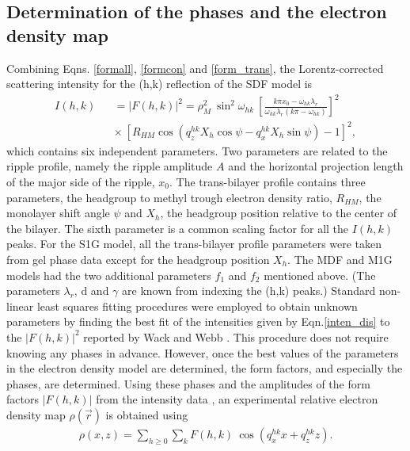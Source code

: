\subsection{Determination of the phases and the electron density map}

Combining Eqns. \ref{formall}, \ref{formcon} and \ref{form_trans}, the 
Lorentz-corrected scattering intensity for the (h,k) reflection of the 
SDF model is
\begin{eqnarray}
\label{inten_dis}
I(h,k) && = |F(h,k)|^2 
= \rho_M^2\ \sin^2 \omega_{hk}\ \left[\frac{k \pi x_0 -
\omega_{hk} \lambda_r}{\omega_{hk} \lambda_r (k \pi 
- \omega_{hk})} \right]^2 \nonumber\\
&& \times\ [R_{HM} \cos (q_z^{hk} X_h \cos \psi - q_x^{hk} X_h \sin \psi) -1]^2,
\end{eqnarray}
which contains six independent parameters.
Two parameters are related to the ripple profile, namely
the ripple amplitude $A$ and the horizontal projection length of the major side
of the ripple, $x_0$. The trans-bilayer profile contains three
parameters, the headgroup to methyl trough electron
density ratio, $R_{HM}$, the monolayer shift angle $\psi$ and 
$X_h$, the headgroup position relative to the center of the bilayer. 
The sixth parameter is a common scaling factor for all the
$I(h,k)$ peaks.  For the S1G model, all the trans-bilayer profile parameters
were taken from gel phase data \cite{WSN89} except for the headgroup position
$X_h$.   The MDF and M1G models had 
the two additional parameters
$f_1$ and $f_2$ mentioned above.
(The parameters ${\lambda}_r$, d and $\gamma$ are known
from indexing the (h,k) peaks.)
Standard non-linear least squares fitting procedures were employed to
obtain unknown parameters by finding the best
fit of the intensities given by Eqn.\ref{inten_dis} to the $|F(h,k)|^2$ reported
by Wack and Webb \cite{Wac89a}. 
This procedure does not require knowing any phases in advance.  However,
once the best values of the parameters in the electron density model are
determined, the form factors, and especially the phases, are determined.
Using these phases and the amplitudes of the form factors $|F(h,k)|$ from 
the intensity data \cite{Wac89a},
an experimental relative electron density map $\rho(\vec{r})$ 
is obtained using
\begin{eqnarray}
\label{discretell}
\rho(x,z) = \sum_{h \geq 0} \sum_{k} F(h,k) \ \cos(q^{hk}_x x + q^{hk}_z z).
\end{eqnarray}
